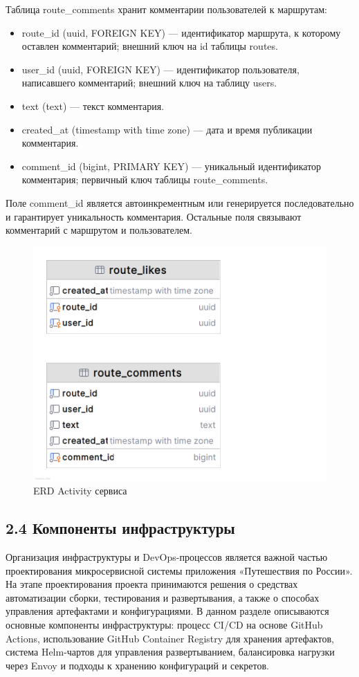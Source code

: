 Таблица route\_comments хранит комментарии пользователей к маршрутам:
\begin{itemize}
    \item route\_id (uuid, FOREIGN KEY) — идентификатор маршрута, к которому оставлен комментарий; внешний ключ на id таблицы routes.
    \item user\_id (uuid, FOREIGN KEY) — идентификатор пользователя, написавшего комментарий; внешний ключ на таблицу users.
    \item text (text) — текст комментария.
    \item created\_at (timestamp with time zone) — дата и время публикации комментария.
    \item comment\_id (bigint, PRIMARY KEY) — уникальный идентификатор комментария; первичный ключ таблицы route\_comments.
\end{itemize}
Поле comment\_id является автоинкрементным или генерируется последовательно и гарантирует уникальность комментария. Остальные поля связывают комментарий с маршрутом и пользователем.
\begin{figure}[H]
        \centering
        \includegraphics[width=0.8\linewidth]{Images/second_chapter_backend_architecture/Picture13.png}
        \caption{ERD Activity сервиса}
        \label{fig:activity-service-erd}
\end{figure}

\subsection*{2.4 Компоненты инфраструктуры}
Организация инфраструктуры и DevOps-процессов является важной частью проектирования микросервисной системы приложения «Путешествия по России». На этапе проектирования проекта принимаются решения о средствах автоматизации сборки, тестирования и развертывания, а также о способах управления артефактами и конфигурациями. В данном разделе описываются основные компоненты инфраструктуры: процесс CI/CD на основе GitHub Actions, использование GitHub Container Registry для хранения артефактов, система Helm-чартов для управления развертыванием, балансировка нагрузки через Envoy и подходы к хранению конфигураций и секретов.

